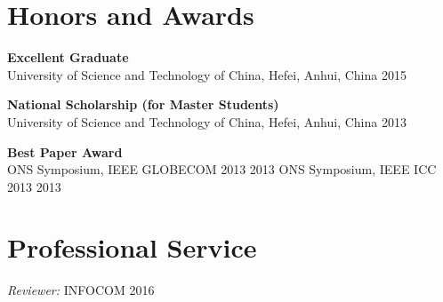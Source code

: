\documentclass[line,11pt,letter]{/Users/longgong/Dropbox/git-reps/easy_cv/includes/cls/myRes}
\begin{document}
\begin{resume}
\section{Honors and Awards}
\vspace{-4pt}
{\setlength{\parskip}{0pt}
{\bf Excellent Graduate}\\
{\hspace*{1em} University of Science and Technology of China, Hefei, Anhui, China \hfill 2015\break}
}
\sspace

{\setlength{\parskip}{0pt}
{\bf National Scholarship (for Master Students)}\\
{\hspace*{1em} University of Science and Technology of China, Hefei, Anhui, China \hfill 2013\break}
}
\sspace

{\setlength{\parskip}{0pt}
{\bf Best Paper Award}\\
{\hspace*{1em} ONS Symposium, IEEE GLOBECOM 2013 \hfill 2013\break}
{\hspace*{1em} ONS Symposium, IEEE ICC 2013 \hfill 2013\break}
}
\vspace*{2pt}
\negspace
\section{Professional Service}
\vspace{-4pt}
\setlength{\parskip}{0pt}
{\sl Reviewer:} \textsc{INFOCOM 2016}\\
% 
\end{resume}
\end{document}
